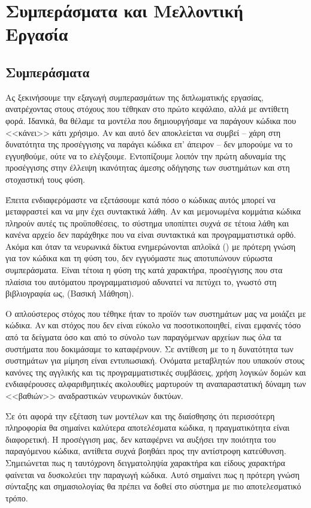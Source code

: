 \chapter{Συμπεράσματα και Μελλοντική Εργασία}

\section{Συμπεράσματα}

Ας ξεκινήσουμε την εξαγωγή συμπερασμάτων της διπλωματικής εργασίας, ανατρέχοντας στους στόχους που τέθηκαν στο πρώτο κεφάλαιο, αλλά με αντίθετη φορά.
Ιδανικά, θα θέλαμε τα μοντέλα που δημιουργήσαμε να παράγουν κώδικα που <<κάνει>> κάτι χρήσιμο. Αν και αυτό δεν αποκλείεται να συμβεί -- χάρη στη δυνατότητα της προσέγγισης να παράγει κώδικα  επ' άπειρον -- δεν μπορούμε να το εγγυηθούμε, ούτε να το ελέγξουμε.
Εντοπίζουμε λοιπόν την πρώτη αδυναμία της προσέγγισης στην έλλειψη ικανότητας άμεσης οδήγησης των συστημάτων και στη στοχαστική τους φύση.

Έπειτα ενδιαφερόμαστε να εξετάσουμε κατά πόσο ο κώδικας αυτός μπορεί να μεταφραστεί και να μην έχει συντακτικά λάθη.
Αν και μεμονωμένα κομμάτια κώδικα πληρούν αυτές τις προϋποθέσεις, το σύστημα υποπίπτει συχνά σε τέτοια λάθη και κανένα αρχείο δεν παράχθηκε που να είναι συντακτικά και προγραμματιστικά ορθό. 
Ακόμα και όταν τα νευρωνικά δίκτυα ενημερώνονται απλοϊκά () με πρότερη γνώση για τον κώδικα και τη φύση του, δεν εγγυόμαστε πως αποτυπώνουν εύρωστα συμπεράσματα.
Είναι τέτοια η φύση της κατά χαρακτήρα,  προσέγγισης που στα πλαίσια του αυτόματου προγραμματισμού αδυνατεί να πετύχει το, γνωστό στη βιβλιογραφία ως,  (Βασική Μάθηση).

Ο απλούστερος στόχος που τέθηκε ήταν το προϊόν των συστημάτων μας να μοιάζει με κώδικα. Αν και στόχος που δεν είναι εύκολο να ποσοτικοποιηθεί, είναι εμφανές τόσο από τα δείγματα όσο και από το σύνολο των παραγόμενων αρχείων πως όλα τα συστήματα που δοκιμάσαμε το καταφέρνουν. 
Σε αντίθεση με το  η δυνατότητα των συστημάτων για μίμηση είναι εντυπωσιακή.
Ονόματα μεταβλητών που υπακούν στους κανόνες της αγγλικής και τις προγραμματιστικές συμβάσεις, χρήση λογικών δομών και ενδιαφέρουσες αλφαριθμητικές ακολουθίες μαρτυρούν τη αναπαραστατική δύναμη των <<βαθιών>> αναδραστικών νευρωνικών δικτύων.

Σε ότι αφορά την εξέταση των  μοντέλων και της διαίσθησης ότι περισσότερη πληροφορία θα σημαίνει καλύτερα αποτελέσματα κώδικα, η πραγματικότητα είναι διαφορετική.
Η προσέγγιση μας, δεν καταφέρνει να αυξήσει την ποιότητα του παραγόμενου κώδικα, αντίθετα συχνά βοηθάει προς την αντίστροφη κατεύθυνση.
Σημειώνεται πως η ταυτόχρονη δειγματοληψία χαρακτήρα και είδους χαρακτήρα φαίνεται να δυσκολεύει την παραγωγή κώδικα.
Αυτό σημαίνει πως η πρότερη γνώση σύνταξης και σημασιολογίας  θα πρέπει να δοθεί στο σύστημα με πιο αποτελεσματικό τρόπο.


